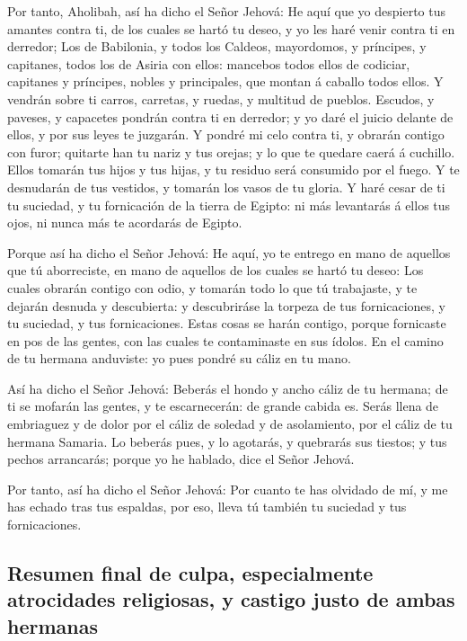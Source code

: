  Por tanto, Aholibah, así ha dicho el Señor Jehová: He
aquí que yo despierto tus amantes contra ti, de los cuales se hartó tu
deseo, y yo les haré venir contra ti en derredor;  Los de
Babilonia, y todos los Caldeos, mayordomos, y príncipes, y capitanes,
todos los de Asiria con ellos: mancebos todos ellos de codiciar,
capitanes y príncipes, nobles y principales, que montan á caballo todos
ellos.  Y vendrán sobre ti carros, carretas, y ruedas, y
multitud de pueblos. Escudos, y paveses, y capacetes pondrán contra ti
en derredor; y yo daré el juicio delante de ellos, y por sus leyes te
juzgarán.  Y pondré mi celo contra ti, y obrarán contigo
con furor; quitarte han tu nariz y tus orejas; y lo que te quedare caerá
á cuchillo. Ellos tomarán tus hijos y tus hijas, y tu residuo será
consumido por el fuego.  Y te desnudarán de tus vestidos,
y tomarán los vasos de tu gloria.  Y haré cesar de ti tu
suciedad, y tu fornicación de la tierra de Egipto: ni más levantarás á
ellos tus ojos, ni nunca más te acordarás de Egipto.

 Porque así ha dicho el Señor Jehová: He aquí, yo te
entrego en mano de aquellos que tú aborreciste, en mano de aquellos de
los cuales se hartó tu deseo:  Los cuales obrarán contigo
con odio, y tomarán todo lo que tú trabajaste, y te dejarán desnuda y
descubierta: y descubriráse la torpeza de tus fornicaciones, y tu
suciedad, y tus fornicaciones.  Estas cosas se harán
contigo, porque fornicaste en pos de las gentes, con las cuales te
contaminaste en sus ídolos.  En el camino de tu hermana
anduviste: yo pues pondré su cáliz en tu mano.

 Así ha dicho el Señor Jehová: Beberás el hondo y ancho
cáliz de tu hermana; de ti se mofarán las gentes, y te escarnecerán: de
grande cabida es.  Serás llena de embriaguez y de dolor
por el cáliz de soledad y de asolamiento, por el cáliz de tu hermana
Samaria.  Lo beberás pues, y lo agotarás, y quebrarás sus
tiestos; y tus pechos arrancarás; porque yo he hablado, dice el Señor
Jehová.

 Por tanto, así ha dicho el Señor Jehová: Por cuanto te
has olvidado de mí, y me has echado tras tus espaldas, por eso, lleva tú
también tu suciedad y tus fornicaciones.

\hypertarget{resumen-final-de-culpa-especialmente-atrocidades-religiosas-y-castigo-justo-de-ambas-hermanas}{%
\subsection{Resumen final de culpa, especialmente atrocidades
religiosas, y castigo justo de ambas
hermanas}\label{resumen-final-de-culpa-especialmente-atrocidades-religiosas-y-castigo-justo-de-ambas-hermanas}}

